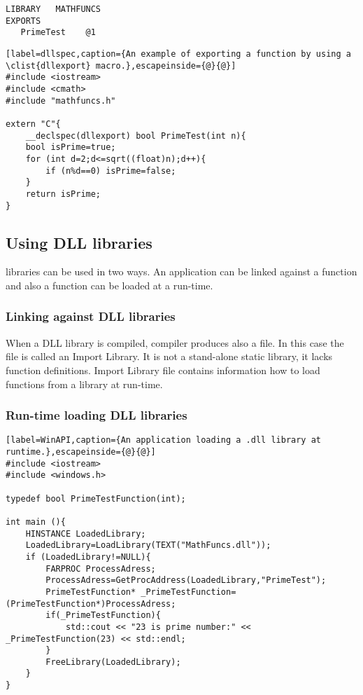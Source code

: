 \begin{lstlisting}[label=DEF,caption={A \clist{Module Definition File} of a library called ``Mathfuncs'' including a function called ``PrimeTest''.}]
LIBRARY   MATHFUNCS
EXPORTS
   PrimeTest	@1
\end{lstlisting}


\begin{lstlisting}[label=dllspec,caption={An example of exporting a function by using a \clist{dllexport} macro.},escapeinside={@}{@}]
#include <iostream>
#include <cmath>
#include "mathfuncs.h"

extern "C"{
	__declspec(dllexport) bool PrimeTest(int n){
	bool isPrime=true;
	for (int d=2;d<=sqrt((float)n);d++){
		if (n%d==0) isPrime=false;
	}
	return isPrime;
}
\end{lstlisting}

\subsection*{Using DLL libraries}
 libraries can be used in two ways. An application can be linked against a  function and also a  function can be loaded at a run-time.

\subsubsection*{Linking against DLL libraries}
When a DLL library is compiled, compiler produces also a  file. In this case the  file is called an Import Library. It is not a stand-alone static library, it lacks function definitions. Import Library file contains information how to load functions from a  library at run-time.

\subsubsection*{Run-time loading DLL libraries}
\label{sec:runtimeloading}


\begin{lstlisting}[label=WinAPI,caption={An application loading a .dll library at runtime.},escapeinside={@}{@}]
#include <iostream>
#include <windows.h>

typedef bool PrimeTestFunction(int);

int main (){
	HINSTANCE LoadedLibrary;
	LoadedLibrary=LoadLibrary(TEXT("MathFuncs.dll"));
	if (LoadedLibrary!=NULL){
		FARPROC ProcessAdress;
		ProcessAdress=GetProcAddress(LoadedLibrary,"PrimeTest");
		PrimeTestFunction* _PrimeTestFunction=(PrimeTestFunction*)ProcessAdress;
		if(_PrimeTestFunction){
			std::cout << "23 is prime number:" << _PrimeTestFunction(23) << std::endl;
		}
		FreeLibrary(LoadedLibrary);
	}
}
\end{lstlisting}

